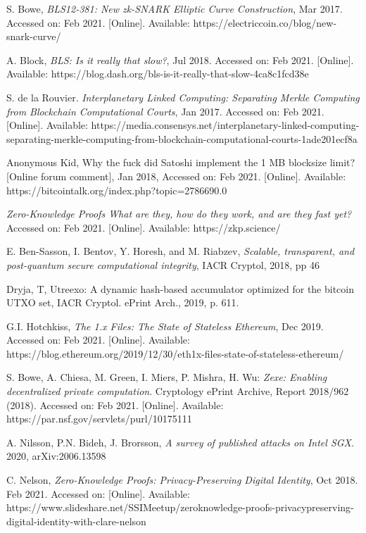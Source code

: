 \documentclass[peerreview]{ieeesyscoin}
\begin{document}
\begin{thebibliography}{00}
 S. Bowe, \textit{BLS12-381: New zk-SNARK Elliptic Curve Construction}, Mar 2017. Accessed on: Feb 2021. [Online]. Available: https://electriccoin.co/blog/new-snark-curve/

  A. Block, \textit{BLS: Is it really that slow?}, Jul 2018. Accessed on: Feb 2021. [Online]. Available: https://blog.dash.org/bls-is-it-really-that-slow-4ca8c1fcd38e

  S. de la Rouvier. \textit{Interplanetary Linked Computing: Separating Merkle Computing from Blockchain Computational Courts}, Jan 2017. Accessed on: Feb 2021. [Online]. Available: https://media.consensys.net/interplanetary-linked-computing-separating-merkle-computing-from-blockchain-computational-courts-1ade201ecf8a

 Anonymous Kid, Why the fuck did Satoshi implement the 1 MB blocksize limit? [Online forum comment], Jan 2018, Accessed on: Feb 2021. [Online]. Available:  https://bitcointalk.org/index.php?topic=2786690.0

 \textit{Zero-Knowledge Proofs What are they, how do they work, and are they fast yet?} Accessed on: Feb 2021. [Online]. Available: https://zkp.science/

 E. Ben-Sasson, I. Bentov, Y. Horesh, and M. Riabzev, \textit{Scalable, transparent, and post-quantum secure computational integrity}, IACR Cryptol, 2018, pp 46 

 Dryja, T, Utreexo: A dynamic hash-based accumulator optimized for the bitcoin UTXO set, IACR Cryptol. ePrint Arch., 2019, p. 611.

 G.I. Hotchkiss, \textit{The 1.x Files: The State of Stateless Ethereum}, Dec 2019. Accessed on: Feb 2021. [Online]. Available:   https://blog.ethereum.org/2019/12/30/eth1x-files-state-of-stateless-ethereum/

 S. Bowe, A. Chiesa, M. Green, I. Miers, P. Mishra, H. Wu: \textit{Zexe: Enabling decentralized private computation}. Cryptology ePrint Archive, Report 2018/962 (2018). Accessed on: Feb 2021. [Online]. Available:  https://par.nsf.gov/servlets/purl/10175111

 A. Nilsson, P.N. Bideh, J. Brorsson, \textit{A survey of published attacks on Intel SGX}. 2020, arXiv:2006.13598

 C. Nelson, \textit{Zero-Knowledge Proofs: Privacy-Preserving Digital Identity}, Oct 2018. Feb 2021. Accessed on: [Online]. Available: https://www.slideshare.net/SSIMeetup/zeroknowledge-proofs-privacypreserving-digital-identity-with-clare-nelson


\end{thebibliography}
\end{document}
